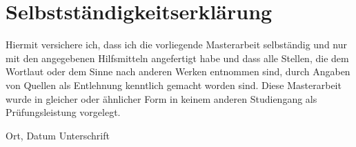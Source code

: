 \documentclass[oneside,12pt,a4paper]{report}
\begin{document}

\cleardoublepage


\cleardoublepage


\cleardoublepage

\appendix








\cleardoublepage
\thispagestyle{empty}
\section*{Selbstst\"andigkeitserkl\"arung}

Hiermit versichere ich, dass ich die vorliegende Masterarbeit 
selbst\"andig und nur mit den angegebenen Hilfsmitteln angefertigt habe und dass alle Stellen, die dem Wortlaut oder dem 
Sinne nach anderen Werken entnommen sind, durch Angaben von Quellen als 
Entlehnung kenntlich gemacht worden sind. 
Diese Masterarbeit wurde in gleicher oder \"ahnlicher Form in keinem anderen 
Studiengang als Pr\"ufungsleistung vorgelegt. 

\vskip 3cm
Ort, Datum	\hfill Unterschrift \hfill 
\end{document}
